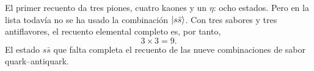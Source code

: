 El primer recuento da tres piones, cuatro kaones y un \(\eta\): ocho estados. Pero en la lista todavía no se ha usado la combinación \(\left\lvert s\bar s\right\rangle\). Con tres sabores y tres antiflavores, el recuento elemental completo es, por tanto,
\begin{equation}
3\times3=9.
\end{equation}
El estado \(s\bar s\) que falta completa el recuento de las nueve combinaciones de sabor quark--antiquark.
